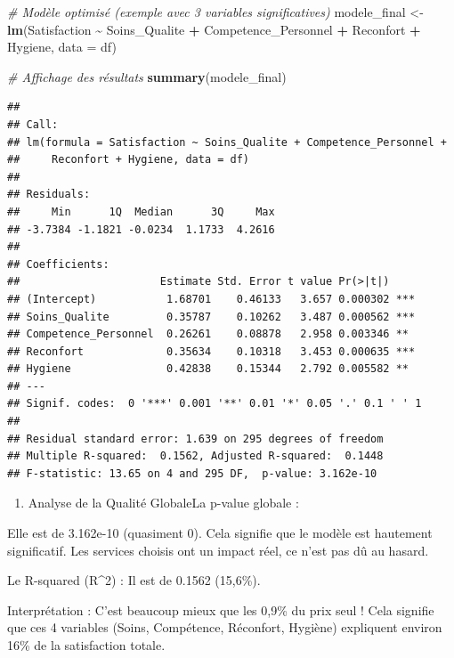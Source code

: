 \documentclass[
]{article}
\newenvironment{Shaded}{\begin{snugshade}}{\end{snugshade}}
\newcommand{\AttributeTok}[1]{\textcolor[rgb]{0.13,0.29,0.53}{#1}}
\newcommand{\CommentTok}[1]{\textcolor[rgb]{0.56,0.35,0.01}{\textit{#1}}}
\newcommand{\FunctionTok}[1]{\textcolor[rgb]{0.13,0.29,0.53}{\textbf{#1}}}
\newcommand{\NormalTok}[1]{#1}
\newcommand{\OtherTok}[1]{\textcolor[rgb]{0.56,0.35,0.01}{#1}}
\newcommand{\SpecialCharTok}[1]{\textcolor[rgb]{0.81,0.36,0.00}{\textbf{#1}}}
\providecommand{\tightlist}{%
  \setlength{\itemsep}{0pt}\setlength{\parskip}{0pt}}
\begin{document}
\begin{Shaded}
\begin{Highlighting}[]
\CommentTok{\# Modèle optimisé (exemple avec 3 variables significatives)}
\NormalTok{modele\_final }\OtherTok{\textless{}{-}} \FunctionTok{lm}\NormalTok{(Satisfaction }\SpecialCharTok{\textasciitilde{}}\NormalTok{ Soins\_Qualite }\SpecialCharTok{+}\NormalTok{ Competence\_Personnel }\SpecialCharTok{+}\NormalTok{ Reconfort  }\SpecialCharTok{+}\NormalTok{ Hygiene, }\AttributeTok{data =}\NormalTok{ df)}

\CommentTok{\# Affichage des résultats}
\FunctionTok{summary}\NormalTok{(modele\_final)}
\end{Highlighting}
\end{Shaded}

\begin{verbatim}
## 
## Call:
## lm(formula = Satisfaction ~ Soins_Qualite + Competence_Personnel + 
##     Reconfort + Hygiene, data = df)
## 
## Residuals:
##     Min      1Q  Median      3Q     Max 
## -3.7384 -1.1821 -0.0234  1.1733  4.2616 
## 
## Coefficients:
##                      Estimate Std. Error t value Pr(>|t|)    
## (Intercept)           1.68701    0.46133   3.657 0.000302 ***
## Soins_Qualite         0.35787    0.10262   3.487 0.000562 ***
## Competence_Personnel  0.26261    0.08878   2.958 0.003346 ** 
## Reconfort             0.35634    0.10318   3.453 0.000635 ***
## Hygiene               0.42838    0.15344   2.792 0.005582 ** 
## ---
## Signif. codes:  0 '***' 0.001 '**' 0.01 '*' 0.05 '.' 0.1 ' ' 1
## 
## Residual standard error: 1.639 on 295 degrees of freedom
## Multiple R-squared:  0.1562, Adjusted R-squared:  0.1448 
## F-statistic: 13.65 on 4 and 295 DF,  p-value: 3.162e-10
\end{verbatim}

\begin{enumerate}
\def\labelenumi{\arabic{enumi}.}
\tightlist
\item
  Analyse de la Qualité GlobaleLa p-value globale :
\end{enumerate}

Elle est de 3.162e-10 (quasiment 0). Cela signifie que le modèle est
hautement significatif. Les services choisis ont un impact réel, ce
n'est pas dû au hasard.

Le R-squared (R\^{}2) : Il est de 0.1562 (15,6\%).

Interprétation : C'est beaucoup mieux que les 0,9\% du prix seul ! Cela
signifie que ces 4 variables (Soins, Compétence, Réconfort, Hygiène)
expliquent environ 16\% de la satisfaction totale.
\end{document}
